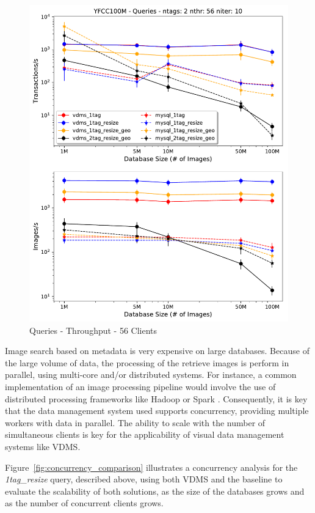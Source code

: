 \begin{figure}[t!]
\centering
\includegraphics[width=\columnwidth]{figures/queries_throughput_56}
\caption{Queries - Throughput - 56 Clients}
\label{fig:q_throughput_56}
\end{figure}

Image search based on metadata is very expensive on large databases.
Because of the large volume of data, the processing of the retrieve images
is perform in parallel, using multi-core and/or distributed systems.
For instance, a common implementation of an image processing pipeline
would involve the use of distributed processing frameworks
like Hadoop \cite{hadoop} or Spark \cite{spark}.
Consequently, it is key that the data management system used supports
concurrency, providing multiple workers with data in parallel.
The ability to scale with the number of simultaneous clients is key for the
applicability of visual data management systems like VDMS.

Figure~\ref{fig:concurrency_comparison} illustrates a concurrency analysis for
the \textit{1tag\_resize} query, described above, using both VDMS and
the baseline to evaluate the scalability of both solutions, as the
size of the databases grows and as the number of concurrent clients grows.

